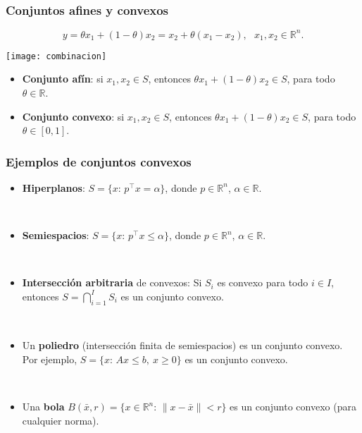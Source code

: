 \documentclass{beamer}
\begin{document}
\begin{frame}
\frametitle{Conjuntos afines y convexos}

\[
y = \theta x_1 + (1-\theta)x_2 = x_2 + \theta (x_1-x_2),\ \ \  x_1,x_2\in\mathbb{R}^n.
\]


\begin{center}
\texttt{[image: combinacion]}
\end{center}

\begin{itemize}
\item \textbf{Conjunto afín}: si $x_1,x_2\in S$, entonces $\theta x_1 + (1-\theta)x_2\in S$, para todo $\theta\in \mathbb{R}$.
\item \textbf{Conjunto convexo}: si $x_1,x_2\in S$, entonces $\theta x_1 + (1-\theta)x_2\in S$, para todo $\theta\in [0,1]$.
\end{itemize}

\end{frame}
\begin{frame}
\frametitle{Ejemplos de conjuntos convexos}

\begin{itemize}
\item \textbf{Hiperplanos}: $S=\{x:\, p^\top x = \alpha\}$, donde $p\in\mathbb{R}^n$, $\alpha\in\mathbb{R}$. 

\

\item \textbf{Semiespacios}: $S=\{x:\, p^\top x \leq \alpha\}$, donde $p\in\mathbb{R}^n$, $\alpha\in\mathbb{R}$. 

\

\item \textbf{Intersección arbitraria} de convexos: Si $S_i$ es convexo para todo $i\in I$, entonces $S=\bigcap_{i=1}^I S_i$ es un conjunto convexo.

\

\item Un \textbf{poliedro} (intersección finita de semiespacios) es un conjunto convexo. Por ejemplo, $S=\{x:\, Ax\leq b,\ x\geq 0\}$ es un conjunto convexo.


\

\item Una \textbf{bola} $B(\bar x,r)=\{x\in\mathbb{R}^n:\, \|x-\bar x\|<r\}$ es un conjunto convexo (para cualquier norma).


\end{itemize}
\end{frame}
\end{document}

